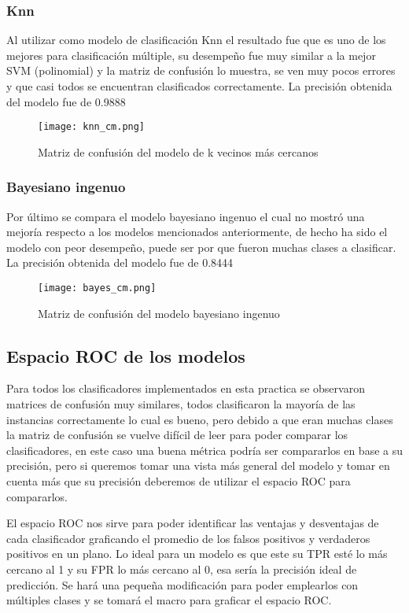\documentclass[sigconf,authorversion,nonacm]{acmart}
\begin{document}
\subsubsection{Knn}
Al utilizar como modelo de clasificación Knn el resultado fue que es uno de los mejores para clasificación múltiple, su desempeño fue muy similar a la mejor SVM (polinomial) y la matriz de confusión lo muestra, se ven muy pocos errores y que casi todos se encuentran clasificados correctamente.
La precisión obtenida del modelo fue de 0.9888

\begin{figure}[H]
  \centering
  \texttt{[image: knn\_cm.png]}
  \caption{Matriz de confusión del modelo de k vecinos más cercanos}
\end{figure}

\subsubsection{Bayesiano ingenuo}
Por último se compara el modelo bayesiano ingenuo el cual no mostró una mejoría respecto a los modelos mencionados anteriormente, de hecho ha sido el modelo con peor desempeño, puede ser por que fueron muchas clases a clasificar.
La precisión obtenida del modelo fue de 0.8444

\begin{figure}[H]
  \centering
  \texttt{[image: bayes\_cm.png]}
  \caption{Matriz de confusión del modelo bayesiano ingenuo}
\end{figure}

\subsection{Espacio ROC de los modelos}
Para todos los clasificadores implementados en esta practica se observaron matrices de confusión muy similares, todos clasificaron la mayoría de las instancias correctamente lo cual es bueno, pero debido a que eran muchas clases la matriz de confusión se vuelve difícil de leer para poder comparar los clasificadores, en este caso una buena métrica podría ser compararlos en base a su precisión, pero si queremos tomar una vista más general del modelo y tomar en cuenta más que su precisión deberemos de utilizar el espacio ROC para compararlos.

El espacio ROC nos sirve para poder identificar las ventajas y desventajas de cada clasificador graficando el promedio de los falsos positivos y verdaderos positivos en un plano. Lo ideal para un modelo es que este su TPR esté lo más cercano al 1 y su FPR lo más cercano al 0, esa sería la precisión ideal de predicción. Se hará una pequeña modificación para poder emplearlos con múltiples clases y se tomará el macro para graficar el espacio ROC.
\end{document}
